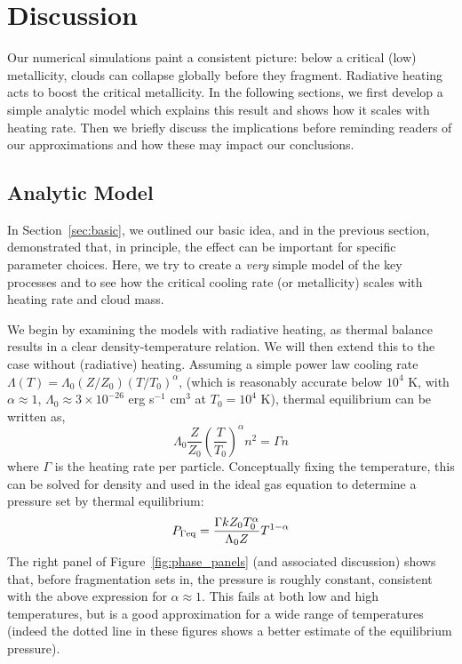 \documentclass[useAMS,usenatbib]{mn2e}
\begin{document}
% 
\section{Discussion}
\label{sec:discussion}

Our numerical simulations paint a consistent picture: below a critical (low) metallicity, clouds can collapse globally before they fragment.  Radiative heating acts to boost the critical metallicity.  In the following sections, we first develop a simple analytic model which explains this result and shows how it scales with  heating rate.  Then we briefly discuss the implications before reminding readers of our approximations and how these may impact our conclusions.

\subsection{Analytic Model}

In Section~\ref{sec:basic}, we outlined our basic idea, and in the previous section, demonstrated that, in principle, the effect can be important for specific parameter choices.  Here, we try to create a {\it very} simple model of the key processes and to see how the critical cooling rate (or metallicity) scales with heating rate and cloud mass.

We begin by examining the models with radiative heating, as thermal balance results in a clear density-temperature relation.  We will then extend this to the case without (radiative) heating.  Assuming a simple power law cooling rate $\Lambda(T) = \Lambda_0 (Z/Z_0) (T/T_0)^{\alpha}$, (which is reasonably accurate below $10^4$ K, with $\alpha \approx 1$, $\Lambda_0 \approx 3 \times 10^{-26}$ erg s$^{-1}$ cm$^{3}$ at $T_0 = 10^4$ K), thermal equilibrium can be written as,
\begin{equation}
\Lambda_0 \frac{Z}{Z_0} \left( \frac{T}{T_0} \right)^{\alpha} n^2 = \Gamma n
\label{eq:thermal_eq}
\end{equation}
where $\Gamma$ is the heating rate per particle.  Conceptually fixing the temperature, this can be solved for density and used in the ideal gas equation to determine a pressure set by thermal equilibrium:
\begin{equation}
P_{\Gamma \rm eq} = \frac{\Gamma k Z_0 T_0^{\alpha}}{\Lambda_0 Z} T^{1-\alpha}
\label{eq:peq}
\end{equation}
The right panel of Figure~\ref{fig:phase_panels} (and associated discussion) shows that, before fragmentation sets in, the pressure is roughly constant, consistent with the above expression for $\alpha \approx 1$.  This fails at both low and high temperatures, but is a good approximation for a wide range of temperatures (indeed the dotted line in these figures shows a better estimate of the equilibrium pressure).
\end{document}
